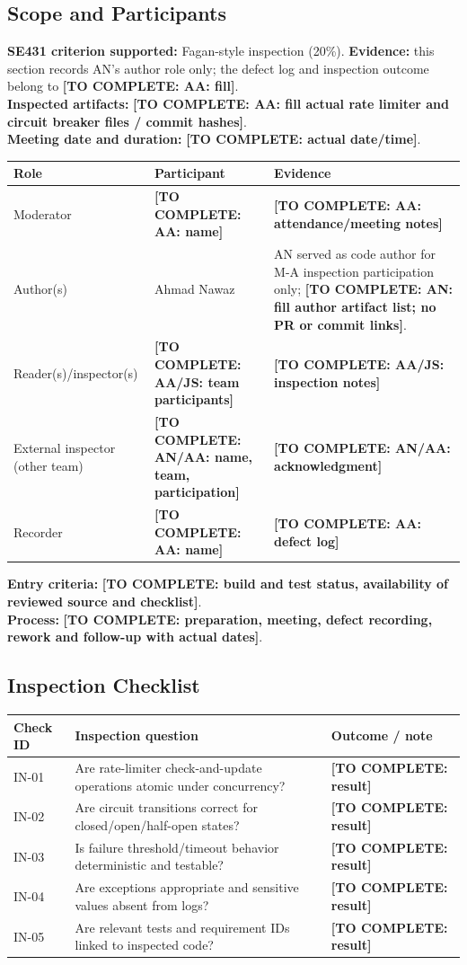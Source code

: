 \documentclass[11pt,a4paper]{article}
\newcommand{\ma}{Ahmad Nawaz}
\newcommand{\todo}[1]{\textcolor{red!70!black}{\textbf{[TO COMPLETE: #1]}}}
\begin{document}
\subsection{Scope and Participants}
\textbf{SE431 criterion supported:} Fagan-style inspection (20\%). \textbf{Evidence:} this section records AN's author role only; the defect log and inspection outcome belong to \todo{AA: fill}.\\
\textbf{Inspected artifacts:} \todo{AA: fill actual rate limiter and circuit breaker files / commit hashes}.\\
\textbf{Meeting date and duration:} \todo{actual date/time}.\\
\begin{longtable}{L{3.8cm} L{4.7cm} L{4cm}}\toprule
\textbf{Role} & \textbf{Participant} & \textbf{Evidence}\\\midrule\endhead
Moderator & \todo{AA: name} & \todo{AA: attendance/meeting notes}\\
Author(s) & \ma & AN served as code author for M-A inspection participation only; \todo{AN: fill author artifact list; no PR or commit links}.\\
Reader(s)/inspector(s) & \todo{AA/JS: team participants} & \todo{AA/JS: inspection notes}\\
External inspector (other team) & \todo{AN/AA: name, team, participation} & \todo{AN/AA: acknowledgment}\\
Recorder & \todo{AA: name} & \todo{AA: defect log}\\\bottomrule\end{longtable}
\textbf{Entry criteria:} \todo{build and test status, availability of reviewed source and checklist}.\\
\textbf{Process:} \todo{preparation, meeting, defect recording, rework and follow-up with actual dates}.
\subsection{Inspection Checklist}
\begin{longtable}{L{2cm} L{8.5cm} L{2.5cm}}\toprule
\textbf{Check ID} & \textbf{Inspection question} & \textbf{Outcome / note}\\\midrule\endhead
IN-01 & Are rate-limiter check-and-update operations atomic under concurrency? & \todo{result}\\
IN-02 & Are circuit transitions correct for closed/open/half-open states? & \todo{result}\\
IN-03 & Is failure threshold/timeout behavior deterministic and testable? & \todo{result}\\
IN-04 & Are exceptions appropriate and sensitive values absent from logs? & \todo{result}\\
IN-05 & Are relevant tests and requirement IDs linked to inspected code? & \todo{result}\\\bottomrule\end{longtable}
\end{document}
